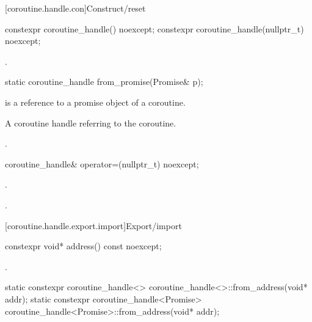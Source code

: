 [coroutine.handle.con]{Construct/reset}

%
\begin{itemdecl}
constexpr coroutine_handle() noexcept;
constexpr coroutine_handle(nullptr_t) noexcept;
\end{itemdecl}

\begin{itemdescr}
\pnum
\ensures
{}.
\end{itemdescr}

%
\begin{itemdecl}
static coroutine_handle from_promise(Promise& p);
\end{itemdecl}

\begin{itemdescr}
\pnum
\expects
{} is a reference to a promise object of a coroutine.

\pnum
\returns
A coroutine handle  referring to the coroutine.

\pnum
\ensures
{}.
\end{itemdescr}

%
\begin{itemdecl}
coroutine_handle& operator=(nullptr_t) noexcept;
\end{itemdecl}

\begin{itemdescr}
\pnum
\ensures
{}.

\pnum
\returns
{}.
\end{itemdescr}

[coroutine.handle.export.import]{Export/import}

%
\begin{itemdecl}
constexpr void* address() const noexcept;
\end{itemdecl}

\begin{itemdescr}
\pnum
\returns
{}.
\end{itemdescr}

%
\begin{itemdecl}
static constexpr coroutine_handle<> coroutine_handle<>::from_address(void* addr);
static constexpr coroutine_handle<Promise> coroutine_handle<Promise>::from_address(void* addr);
\end{itemdecl}

